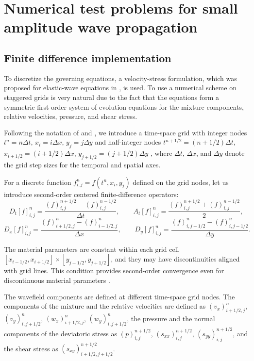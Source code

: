 \documentclass[3p,times,table]{article}
\begin{document}
\section{Numerical test problems for small amplitude wave 
propagation}\label{sec.numerics}

\subsection{Finite difference implementation}
To discretize the governing equations, a velocity-stress formulation, which was
proposed for elastic-wave equations in  \cite{Levander1988,Virieux1986}, is used. 
To use a numerical scheme on staggered grids is very natural due to 
the fact that the equations form a symmetric first order system of evolution 
equations for the  mixture components, relative velocities, pressure, and 
shear stress.

Following the notation of \cite{Virieux1986} and \cite{Graves1996}, we 
introduce a time-space grid with integer nodes $t^{n}=n\Delta t$, 
$x_{i}=i\Delta 
x$, $y_{j}=j\Delta y$  and half-integer nodes $t^{n+1/2}=(n+1/2)\Delta t$, 
$x_{i+1/2}=(i+1/2)\Delta x$, $y_{j+1/2}=(j+1/2)\Delta y$ , where  $\Delta t$, 
$\Delta x$, and $\Delta y$ denote the grid step sizes for the temporal and spatial 
axes.

 For a discrete function $f_{i,j}^{n}=f(t^{n},x_{i},y_{j})$ defined on the grid 
 nodes, let us introduce second-order  centered finite-difference 
 operators:
\begin{equation}
    D_t[f]_{i, j}^{n} = \frac{(f)_{i, j}^{n+1/2} - (f)_{i, j}^{n-1/2}}{\Delta t}, \qquad A_t[f]_{i, j}^{n} = \frac{(f)_{i, j}^{n+1/2} + (f)_{i ,j}^{n-1/2}}{2},
    \label{Dt}
\end{equation}
\begin{equation}
    D_x[f]_{i, j}^n = \frac{(f)_{i+1/2, j}^{n} - (f)_{i-1/2, j}^{n}}{\Delta x}, \qquad D_y[f]_{i, j}^n = \frac{(f)_{i, j+1/2}^{n} - (f)_{i, j-1/2}^{n}}{\Delta y}.
    \label{Dx}
\end{equation}

The material parameters are constant within each grid cell 
$[x_{i-1/2}, x_{i+1/2}] \times[ y_{j-1/2}, y_{j+1/2}]$, and they may have 
discontinuities aligned with grid lines. This condition provides  
second-order convergence even for discontinuous material parameters 
\cite{Moszo2002}.

The wavefield components are defined at different time-space grid nodes. The 
components of the mixture and the relative velocities are defined as $(v_x)_{i+1/2, 
j}^{n}$, $(v_y)_{i, j+1/2}^{n}$, $(w_x)_{i+1/2, j}^{n}$, $(w_y)_{i, 
j+1/2}^{n}$, the pressure and the normal components of the deviatoric stress as 
$(p)_{i,j}^{n+1/2}$,  $(s_{xx})_{i,j}^{n+1/2}$, $(s_{yy})_{i,j}^{n+1/2}$, and 
the shear stress as $(s_{xy})_{i+1/2, j+1/2}^{n+1/2}$.
\end{document}
